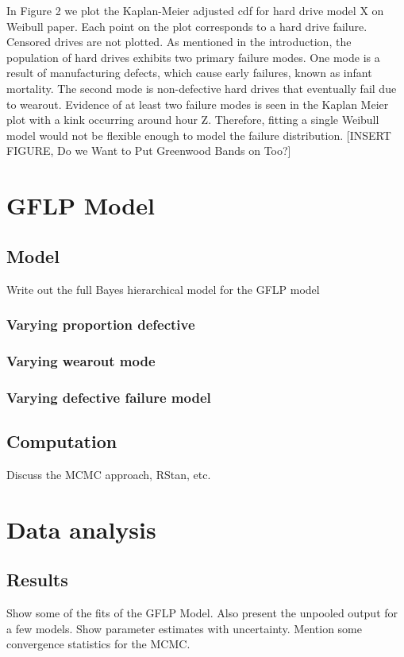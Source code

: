 \documentclass[12pt]{article}
\begin{document}
In Figure 2 we plot the Kaplan-Meier adjusted cdf for hard drive model X on Weibull paper.  Each point on the plot corresponds to a hard drive failure.  Censored drives are not plotted.  As mentioned in the introduction, the population of hard drives exhibits two primary failure modes.  One mode is a result of manufacturing defects, which cause early failures, known as infant mortality.  The second mode is non-defective hard drives that eventually fail due to wearout.   Evidence of at least two failure modes is seen in the Kaplan Meier plot with a kink occurring around hour Z.  Therefore, fitting a single Weibull model would not be flexible enough to model the failure distribution.     [INSERT FIGURE, Do we Want to Put Greenwood Bands on Too?]


\section{GFLP Model}
\subsection{Model}
Write out the full Bayes hierarchical model for the GFLP model
\subsubsection{Varying proportion defective}
\subsubsection{Varying wearout mode}
\subsubsection{Varying defective failure model}


\subsection{Computation}
Discuss the MCMC approach, RStan, etc.

\section{Data analysis}
\subsection{Results}
Show some of the fits of the GFLP Model.  Also present the unpooled output for a few models.  Show parameter estimates with uncertainty. Mention some convergence statistics for the MCMC. 
\end{document}
